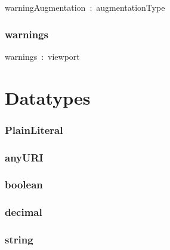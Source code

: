 \documentclass{article}
\begin{document}
warningAugmentation~:~augmentationType

\subsubsection*{warnings}

warnings~:~viewport

\section*{Datatypes}\subsubsection*{PlainLiteral}

\subsubsection*{anyURI}

\subsubsection*{boolean}

\subsubsection*{decimal}

\subsubsection*{string}
\end{document}
